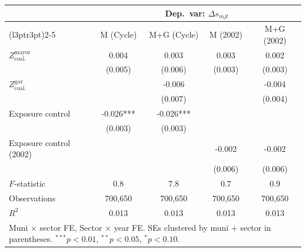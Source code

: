 \begin{tabular}[t]{lcccc}
\toprule
\multicolumn{1}{c}{\textbf{ }} & \multicolumn{4}{c}{\textbf{Dep.~var: $\Delta s_{mjt}$}} \\
\cmidrule(l{3pt}r{3pt}){2-5}
  & M (Cycle) & M+G (Cycle) & M (2002) & M+G (2002)\\
\midrule
$Z^{\text{mayor}}_{\text{coal.}}$ & 0.004 & 0.003 & 0.003 & 0.002\\
 & (0.005) & (0.006) & (0.003) & (0.003)\\
$Z^{\text{gov}}_{\text{coal.}}$ &  & -0.006 &  & -0.004\\
 &  & (0.007) &  & (0.004)\\
Exposure control & -0.026*** & -0.026*** &  & \\
 & (0.003) & (0.003) &  & \\
Exposure control (2002) &  &  & -0.002 & -0.002\\
 &  &  & (0.006) & (0.006)\\
\midrule
$F$-statistic & 0.8 & 7.8 & 0.7 & 0.9\\
Observations & 700,650 & 700,650 & 700,650 & 700,650\\
$R^2$ & 0.013 & 0.013 & 0.013 & 0.013\\
\bottomrule
\multicolumn{5}{l}{\rule{0pt}{1em}Muni $\times$ sector FE, Sector $\times$ year FE. SEs clustered by muni + sector in parentheses. $^{***}p<0.01$, $^{**}p<0.05$, $^{*}p<0.10$.}\\
\end{tabular}
